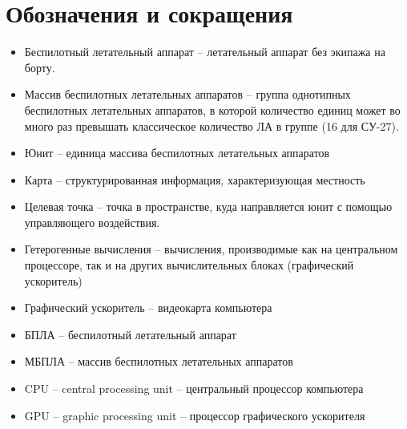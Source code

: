 \section{Обозначения и сокращения}

\begin{itemize}
\item Беспилотный летательный аппарат -- летательный
      аппарат без экипажа \lb на борту.

\item Массив беспилотных летательных аппаратов -- группа
      однотипных беспилотных летательных аппаратов, в которой
      количество единиц может во много раз превышать
      классическое количество ЛА в группе (16 для СУ-27).

\item Юнит -- единица массива беспилотных летательных аппаратов

\item Карта -- структурированная информация, характеризующая местность

\item Целевая точка -- точка в пространстве, куда направляется юнит с 
    помощью управляющего воздействия.

\item Гетерогенные вычисления -- вычисления, производимые
      как на центральном процессоре, так и на других
      вычислительных блоках (графический ускоритель)

\item Графический ускоритель -- видеокарта компьютера

\item БПЛА -- беспилотный летательный аппарат

\item МБПЛА -- массив беспилотных летательных аппаратов

\item CPU -- central processing unit -- центральный процессор компьютера

\item GPU -- graphic processing unit -- процессор графического ускорителя

\end{itemize}
